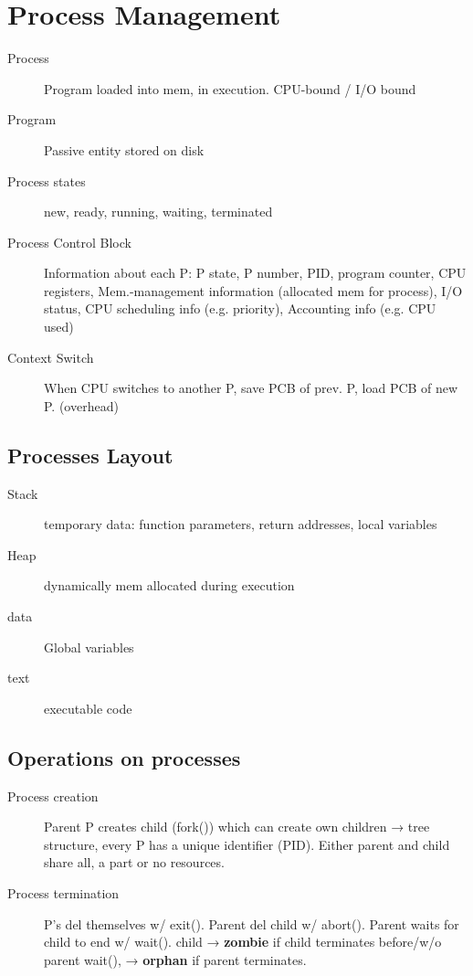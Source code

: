 \section*{Process Management}
\begin{description}
    \item[Process] Program loaded into mem, in execution. CPU-bound / I/O bound %
  \item[Program] Passive entity stored on disk
  \item[Process states] new, ready, running, waiting, terminated
  \item[Process Control Block] Information about each P: P state, P number, PID, program counter, CPU registers, Mem.-management information (allocated mem for process), I/O status, CPU scheduling info (e.g. priority), Accounting info (e.g. CPU used)
  \item[Context Switch] When CPU switches to another P, save PCB of prev. P, load PCB of new P. (overhead)
\end{description}

\subsection*{Processes Layout}
\begin{description}
  \item[Stack] temporary data: function parameters, return addresses, local variables
  \item[Heap] dynamically mem allocated during execution
  \item[data] Global variables
  \item[text] executable code
\end{description}

\subsection*{Operations on processes}
\begin{description}
  \item[Process creation]Parent P creates child (fork()) which can create own children → tree structure, every P has a unique identifier (PID). Either parent and child share all, a part or no resources.
  \item[Process termination] P's del themselves w/ exit(). Parent del child w/ abort(). Parent waits for child to end w/ wait(). child → \textbf{zombie} if child terminates before/w/o parent wait(), → \textbf{orphan} if parent terminates.
\end{description}

